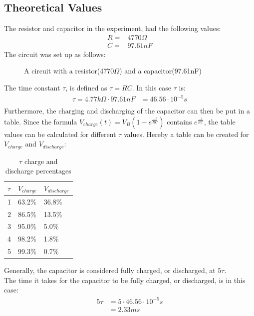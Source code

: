 \subsection{Theoretical Values}
The resistor and capacitor in the experiment, had the following values:
\begin{align*}
 R =& 4770\Omega \\
 C =& 97.61nF
\end{align*}
The circuit was set up as follows:
\begin{figure}[H]
	
	\caption{A circuit with a resistor(4770$\Omega$) and a capacitor(97.61nF)}
\end{figure}
\noindent The time constant $\tau$, is defined as $\tau = RC$. In this case $\tau$ is:
\begin{align*}
	\tau = 4.77 k\Omega \cdot 97.61 nF &= 46.56 \cdot 10^{-5} s \\
\end{align*}
Furthermore, the charging and discharging of the capacitor can then be put in a table. Since the formula $V_{charge}(t)=V_B(1-e^{\frac{-t}{RC}})$ contains $e^{\frac{-t}{RC}}$, the table values can be calculated for different $\tau$ values. Hereby a table can be created for $V_{charge}$ and $V_{discharge}$:
\begin{table}[H]
\center
\begin{tabular}{|l|l|l|}
\hline
$\tau$ & $V_{charge}$ & $V_{discharge}$ \\ \hline
1      & 63.2\%       & 36.8\%         \\ \hline
2      & 86.5\%       & 13.5\%         \\ \hline
3      & 95.0\%       & 5.0\%          \\ \hline
4      & 98.2\%       & 1.8\%          \\ \hline
5      & 99.3\%       & 0.7\%          \\ \hline
\end{tabular}
\caption{$\tau$ charge and discharge percentages}
\end{table}
\noindent Generally, the capacitor is considered fully charged, or discharged, at $5\tau$. \\
The time it takes for the capacitor to be fully charged, or discharged, is in this case:
\begin{align*}
5\tau &= 5 \cdot 46.56 \cdot 10^{-5} s \\
&= 2.33 ms
\end{align*}